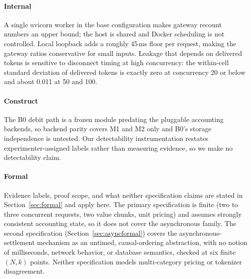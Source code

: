 \documentclass[manuscript,review]{acmart}
\begin{document}
\paragraph{Internal}
A single uvicorn worker in the base configuration makes gateway recount numbers an upper
bound; the host is shared and Docker scheduling is not controlled. Local loopback adds a
roughly 45\,ms floor per request, making the gateway ratios conservative for small
inputs. Leakage that depends on delivered tokens is sensitive to
disconnect timing at high concurrency: the within-cell standard deviation of delivered
tokens is exactly zero at concurrency 20 or below and about 0.011 at 50 and 100.

\paragraph{Construct}
The B0 debit path is a frozen module predating the pluggable accounting backends, so
backend parity covers M1 and M2 only and B0's storage independence is untested. Our detectability instrumentation restates
experimenter-assigned labels rather than measuring evidence, so we make no detectability
claim.

\paragraph{Formal}
Evidence labels, proof scope, and what neither specification claims are stated in
Section~\ref{sec:formal} and apply here. The primary specification is
finite (two to three concurrent requests, two value chunks, unit pricing) and assumes
strongly consistent accounting state, so it does not cover the asynchronous family. The
second specification (Section~\ref{sec:asyncformal}) covers the asynchronous-settlement
mechanism as an untimed, causal-ordering abstraction, with no notion of milliseconds,
network behavior, or database semantics, checked at six finite $(N,k)$ points. Neither
specification models multi-category pricing or tokenizer disagreement.
\end{document}
